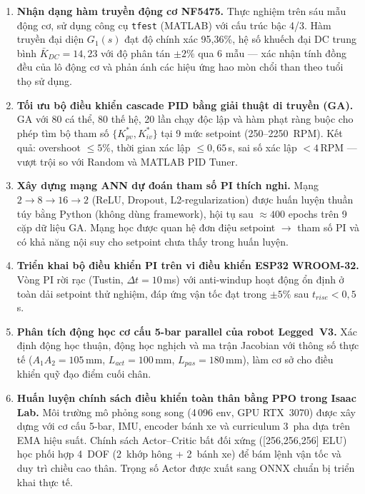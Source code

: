 \begin{enumerate}[leftmargin=1.5cm, label=\arabic*.]
    \item \textbf{Nhận dạng hàm truyền động cơ NF5475.}
    Thực nghiệm trên sáu mẫu động cơ, sử dụng công cụ \texttt{tfest} (MATLAB)
    với cấu trúc bậc 4/3. Hàm truyền đại diện $G_1(s)$ đạt độ chính xác
    95{,}36\%, hệ số khuếch đại DC trung bình $\bar{K}_{DC} = 14{,}23$
    với độ phân tán $\pm 2\%$ qua 6 mẫu — xác nhận tính đồng đều của lô
    động cơ và phản ánh các hiệu ứng hao mòn chổi than theo tuổi thọ sử dụng.

    \item \textbf{Tối ưu bộ điều khiển cascade PID bằng giải thuật di truyền (GA).}
    GA với 80 cá thể, 80 thế hệ, 20 lần chạy độc lập và hàm phạt ràng buộc
    cho phép tìm bộ tham số $\{K_{pv}^*, K_{iv}^*\}$ tại 9 mức setpoint
    (250--2250~RPM). Kết quả: overshoot $\leq 5\%$, thời gian xác lập
    $\leq 0{,}65\,$s, sai số xác lập $< 4\,$RPM — vượt trội so với Random
    và MATLAB PID Tuner.

    \item \textbf{Xây dựng mạng ANN dự đoán tham số PI thích nghi.}
    Mạng $2 \to 8 \to 16 \to 2$ (ReLU, Dropout, L2-regularization)
    được huấn luyện thuần túy bằng Python (không dùng framework),
    hội tụ sau $\approx 400$ epochs trên 9 cặp dữ liệu GA.
    Mạng học được quan hệ đơn điệu setpoint $\to$ tham số PI và
    có khả năng nội suy cho setpoint chưa thấy trong huấn luyện.

    \item \textbf{Triển khai bộ điều khiển PI trên vi điều khiển ESP32 WROOM-32.}
    Vòng PI rời rạc (Tustin, $\Delta t = 10\,$ms) với anti-windup hoạt động
    ổn định ở toàn dải setpoint thử nghiệm, đáp ứng vận tốc đạt trong
    $\pm 5\%$ sau $t_{rise} < 0{,}5\,$s.

    \item \textbf{Phân tích động học cơ cấu 5-bar parallel của robot Legged~V3.}
    Xác định động học thuận, động học nghịch và ma trận Jacobian với thông số
    thực tế ($A_1A_2 = 105\,$mm, $L_{act} = 100\,$mm, $L_{pas} = 180\,$mm),
    làm cơ sở cho điều khiển quỹ đạo điểm cuối chân.

    \item \textbf{Huấn luyện chính sách điều khiển toàn thân bằng PPO trong Isaac Lab.}
    Môi trường mô phỏng song song (4\,096 env, GPU RTX~3070) được xây dựng
    với cơ cấu 5-bar, IMU, encoder bánh xe và curriculum 3~pha dựa trên EMA
    hiệu suất. Chính sách Actor--Critic bất đối xứng ([256,256,256] ELU)
    học phối hợp 4~DOF (2~khớp hông + 2~bánh xe) để bám lệnh vận tốc
    và duy trì chiều cao thân. Trọng số Actor được xuất sang ONNX
    chuẩn bị triển khai thực tế.
\end{enumerate}

